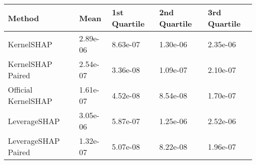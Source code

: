 \begin{tabular}{lllll}
  \toprule
  \textbf{Method} & \textbf{Mean} & \textbf{1st Quartile} & \textbf{2nd Quartile} & \textbf{3rd Quartile} \\ \midrule 
KernelSHAP & 2.89e-06 & 8.63e-07 & 1.30e-06 & 2.35e-06\\
KernelSHAP Paired & \cellcolor{bronze!60}2.54e-07 & \cellcolor{gold!60}3.36e-08 & \cellcolor{bronze!60}1.09e-07 & \cellcolor{bronze!60}2.10e-07\\
Official KernelSHAP & \cellcolor{silver!60}1.61e-07 & \cellcolor{silver!60}4.52e-08 & \cellcolor{silver!60}8.54e-08 & \cellcolor{gold!60}1.70e-07\\
LeverageSHAP & 3.05e-06 & 5.87e-07 & 1.25e-06 & 2.52e-06\\
LeverageSHAP Paired & \cellcolor{gold!60}1.32e-07 & \cellcolor{bronze!60}5.07e-08 & \cellcolor{gold!60}8.22e-08 & \cellcolor{silver!60}1.96e-07\\
\bottomrule
\end{tabular}